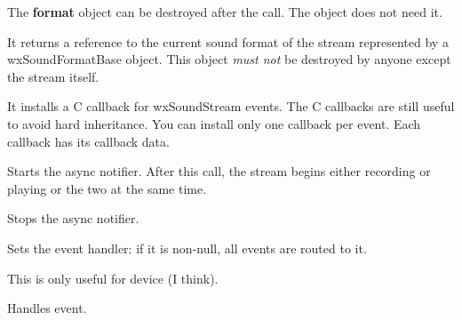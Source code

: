 
The {\bf format} object can be destroyed after the call. The object does not need it.

\label{wxsoundstreamgetsoundformat}

It returns a reference to the current sound format of the stream represented by a
wxSoundFormatBase object. This object {\it must not} be destroyed by anyone except
the stream itself.

\label{wxsoundstreamregister}


It installs a C callback for wxSoundStream events. The C callbacks are still useful
to avoid hard inheritance. You can install only one callback per event. Each callback
has its callback data.

\label{wxsoundstreamstartproduction}


Starts the async notifier. After this call, the stream begins either 
recording or playing or the two at the same time.

\label{wxsoundstreamstopproduction}


Stops the async notifier.

\label{wxsoundstreamseteventhandler}


Sets the event handler: if it is non-null, all events are routed to it.

\label{wxsoundstreamgeterror}


\label{wxsoundstreamgetlastaccess}


\label{wxsoundstreamqueuefilled}


This is only useful for device (I think).

\label{wxsoundstreamonsoundevent}


Handles event.

